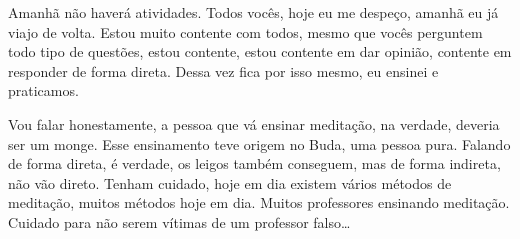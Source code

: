 Amanhã não haverá atividades. Todos vocês, hoje eu me despeço,
amanhã eu já viajo de volta. Estou muito contente com todos, mesmo que
vocês perguntem todo tipo de questões, estou contente, estou contente
em dar opinião, contente em responder de forma direta. Dessa vez fica
por isso mesmo, eu ensinei e praticamos. 

Vou falar honestamente, a pessoa que vá ensinar meditação, na
verdade, deveria ser um monge. Esse ensinamento teve origem no Buda,
uma pessoa pura. Falando de forma direta, é verdade, os leigos também
conseguem, mas de forma indireta, não vão direto. Tenham cuidado, hoje
em dia existem vários métodos de meditação, muitos métodos hoje em dia.
Muitos professores ensinando meditação. Cuidado para não serem vítimas
de um professor falso…
